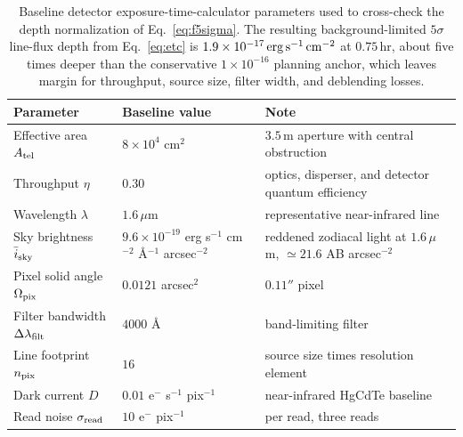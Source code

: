 \documentclass[10pt,onecolumn]{article}
\begin{document}
\begin{table}[tp]
\centering
\sffamily\small
\begin{tabularx}{\textwidth}{@{}l p{3.1cm} X@{}}
\toprule
\textbf{Parameter} & \textbf{Baseline value} & \textbf{Note}\\
\midrule
Effective area $A_{\rm tel}$ & $8\times10^{4}$ cm$^{2}$ & $3.5$\,m aperture with central obstruction\\
Throughput $\eta$ & $0.30$ & optics, disperser, and detector quantum efficiency\\
Wavelength $\lambda$ & $1.6\,\mu$m & representative near-infrared line\\
Sky brightness $\bar i_{\rm sky}$ & $9.6\times10^{-19}$ erg s$^{-1}$ cm$^{-2}$ \AA$^{-1}$ arcsec$^{-2}$ & reddened zodiacal light at $1.6\,\mu$m, $\simeq21.6$ AB arcsec$^{-2}$ \cite{leinert1998}\\
Pixel solid angle $\Omega_{\rm pix}$ & $0.0121$ arcsec$^{2}$ & $0.11''$ pixel\\
Filter bandwidth $\Delta\lambda_{\rm filt}$ & $4000$ \AA & band-limiting filter\\
Line footprint $n_{\rm pix}$ & $16$ & source size times resolution element\\
Dark current $D$ & $0.01$ e$^-$ s$^{-1}$ pix$^{-1}$ & near-infrared HgCdTe baseline\\
Read noise $\sigma_{\rm read}$ & $10$ e$^-$ pix$^{-1}$ & per read, three reads\\
\bottomrule
\end{tabularx}
\caption{Baseline detector exposure-time-calculator parameters used to cross-check the depth normalization of Eq.~\eqref{eq:f5sigma}. The resulting background-limited $5\sigma$ line-flux depth from Eq.~\eqref{eq:etc} is $1.9\times10^{-17}\,{\rm erg\,s^{-1}\,cm^{-2}}$ at $0.75$\,hr, about five times deeper than the conservative $1\times10^{-16}$ planning anchor, which leaves margin for throughput, source size, filter width, and deblending losses.}
\label{tab:etc}
\end{table}
\end{document}
